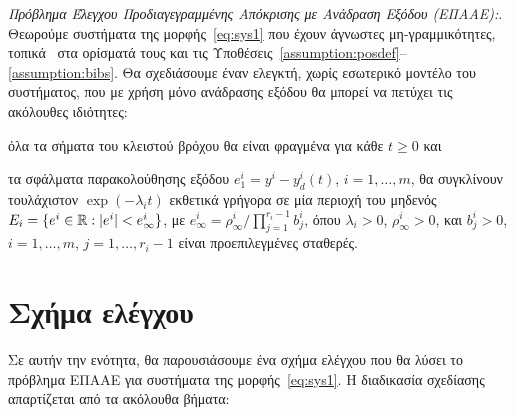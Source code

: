 \emph{Πρόβλημα Έλεγχου Προδιαγεγραμμένης Απόκρισης με Ανάδραση Εξόδου (ΕΠΑΑΕ):}. Θεωρούμε συστήματα της μορφής~\eqref{eq:sys1} που έχουν άγνωστες μη-γραμμικότητες, τοπικά \lip\ στα ορίσματά τους και τις Υποθέσεις~\ref{assumption:posdef}--\ref{assumption:bibs}. Θα σχεδιάσουμε έναν ελεγκτή, χωρίς εσωτερικό μοντέλο του συστήματος, που με χρήση μόνο ανάδρασης εξόδου θα μπορεί να πετύχει τις ακόλουθες ιδιότητες: 
\begin{enumerate*}[label=(\alph*)]
    \item όλα τα σήματα του κλειστού βρόχου θα είναι φραγμένα για κάθε $t \geq 0$ και
    \item τα σφάλματα παρακολούθησης εξόδου $e^i_1 = y^i - y_d^i(t)$, $i = 1,\ldots, m$, θα συγκλίνουν τουλάχιστον $\exp(-\lambda_i t)$ εκθετικά γρήγορα σε μία περιοχή του μηδενός $E_i = \{e^i \in \mathbb{R}: |e^i| < e^i_\infty\}$, με $e_\infty^i = \rho^i_\infty/\prod_{j=1}^{r_i - 1} b_j^i$,  όπου $\lambda_i >0$, $\rho_\infty^i >0$, και $b_j^i>0$, $i = 1,\ldots, m$, $j = 1, \ldots, r_i - 1$ είναι προεπιλεγμένες σταθερές.
\end{enumerate*}

\section{Σχήμα ελέγχου}
\label{section:control}
Σε αυτήν την ενότητα, θα παρουσιάσουμε ένα σχήμα ελέγχου που θα λύσει το πρόβλημα ΕΠΑΑΕ για συστήματα της μορφής~\eqref{eq:sys1}. Η διαδικασία σχεδίασης απαρτίζεται από τα ακόλουθα βήματα:

